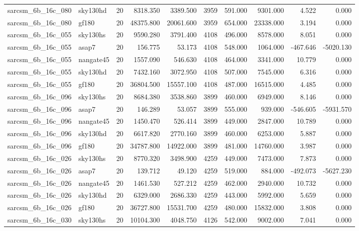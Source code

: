 \documentclass{article}
\begin{document}
\begin{longtable}{llrrrrrrrr}
sarcsm\_6b\_16c\_080 & sky130hd & 20 & 8318.350 & 3389.500 & 3959 & 591.000 & 9301.000 & 4.522 & 0.000 \\
sarcsm\_6b\_16c\_080 & gf180 & 20 & 48375.800 & 20061.600 & 3959 & 654.000 & 23338.000 & 3.194 & 0.000 \\
sarcsm\_6b\_16c\_055 & sky130hs & 20 & 9590.280 & 3791.400 & 4108 & 496.000 & 8578.000 & 8.051 & 0.000 \\
sarcsm\_6b\_16c\_055 & asap7 & 20 & 156.775 & 53.173 & 4108 & 548.000 & 1064.000 & -467.646 & -5020.130 \\
sarcsm\_6b\_16c\_055 & nangate45 & 20 & 1557.090 & 546.630 & 4108 & 464.000 & 3341.000 & 10.779 & 0.000 \\
sarcsm\_6b\_16c\_055 & sky130hd & 20 & 7432.160 & 3072.950 & 4108 & 507.000 & 7545.000 & 6.316 & 0.000 \\
sarcsm\_6b\_16c\_055 & gf180 & 20 & 36804.500 & 15557.100 & 4108 & 487.000 & 16515.000 & 4.485 & 0.000 \\
sarcsm\_6b\_16c\_096 & sky130hs & 20 & 8684.380 & 3538.860 & 3899 & 460.000 & 6949.000 & 8.146 & 0.000 \\
sarcsm\_6b\_16c\_096 & asap7 & 20 & 146.289 & 53.057 & 3899 & 555.000 & 939.000 & -546.605 & -5931.570 \\
sarcsm\_6b\_16c\_096 & nangate45 & 20 & 1450.470 & 526.414 & 3899 & 449.000 & 2847.000 & 10.789 & 0.000 \\
sarcsm\_6b\_16c\_096 & sky130hd & 20 & 6617.820 & 2770.160 & 3899 & 460.000 & 6253.000 & 5.887 & 0.000 \\
sarcsm\_6b\_16c\_096 & gf180 & 20 & 34787.800 & 14922.000 & 3899 & 481.000 & 14760.000 & 3.987 & 0.000 \\
sarcsm\_6b\_16c\_026 & sky130hs & 20 & 8770.320 & 3498.900 & 4259 & 449.000 & 7473.000 & 7.873 & 0.000 \\
sarcsm\_6b\_16c\_026 & asap7 & 20 & 139.712 & 49.120 & 4259 & 519.000 & 884.000 & -492.073 & -5627.230 \\
sarcsm\_6b\_16c\_026 & nangate45 & 20 & 1461.530 & 527.212 & 4259 & 462.000 & 2940.000 & 10.732 & 0.000 \\
sarcsm\_6b\_16c\_026 & sky130hd & 20 & 6329.000 & 2686.330 & 4259 & 443.000 & 5992.000 & 5.659 & 0.000 \\
sarcsm\_6b\_16c\_026 & gf180 & 20 & 36727.800 & 15531.700 & 4259 & 480.000 & 15832.000 & 3.808 & 0.000 \\
sarcsm\_6b\_16c\_030 & sky130hs & 20 & 10104.300 & 4048.750 & 4126 & 542.000 & 9002.000 & 7.041 & 0.000 \\

\end{longtable}
\end{document}
